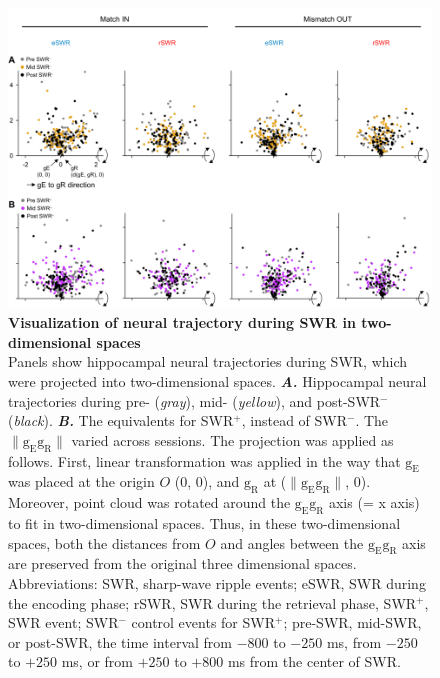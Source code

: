 \documentclass[final,3p,times,twocolumn]{elsarticle}
\begin{document}
        \begin{figure}[ht]
        	\centering
            \includegraphics[width=1\textwidth]{./src/figures/.png/Figure_ID_06.png}
        	\caption{\textbf{
Visualization of neural trajectory during SWR in two-dimensional spaces
}
\smallskip
\\
Panels show hippocampal neural trajectories during SWR, which were projected into two-dimensional spaces. \textbf{\textit{A.}} Hippocampal neural trajectories during pre- (\textit{gray}), mid- (\textit{yellow}), and post-SWR$^-$ (\textit{black}). \textbf{\textit{B.}} The equivalents for SWR$^+$, instead of SWR$^-$. The $\lVert \mathrm{g_{E}g_{R}} \rVert$ varied across sessions. The projection was applied as follows. First, linear transformation was applied in the way that $\mathrm{g_{E}}$ was placed at the origin $O$ (0, 0), and $\mathrm{g_{R}}$ at ($\lVert \mathrm{g_{E}g_{R}} \rVert$, 0). Moreover, point cloud was rotated around the $\mathrm{g_{E}g_{R}}$ axis (= x axis) to fit in two-dimensional spaces. Thus, in these two-dimensional spaces, both the distances from $O$ and angles between the $\mathrm{g_{E}g_{R}}$ axis are preserved from the original three dimensional spaces. Abbreviations: SWR, sharp-wave ripple events; eSWR, SWR during the encoding phase; rSWR, SWR during the retrieval phase, SWR$^+$, SWR event; SWR$^-$ control events for SWR$^+$; pre-SWR, mid-SWR, or post-SWR, the time interval from $-800$ to $-250$ ms, from $-250$ to $+250$ ms, or from $+250$ to $+800$ ms from the center of SWR. 
}
        	\label{fig:06}
        \end{figure}
        \clearpage
\end{document}
